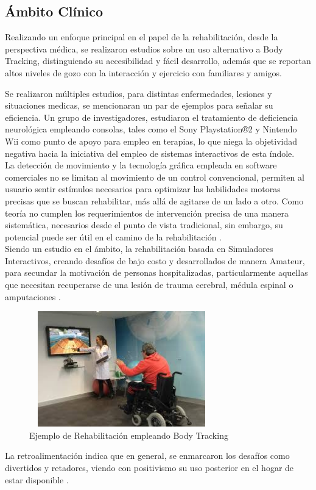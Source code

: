 \subsection{Ámbito Clínico}
Realizando un enfoque principal en el papel de la rehabilitación, desde la perspectiva médica, se realizaron estudios sobre un uso alternativo a Body Tracking, distinguiendo su accesibilidad y fácil desarrollo, además que se reportan altos niveles de gozo con la interacción y ejercicio con familiares y amigos. 

Se realizaron múltiples estudios, para distintas enfermedades, lesiones y situaciones medicas, se mencionaran un par de ejemplos para señalar su eficiencia. Un grupo de investigadores, estudiaron el tratamiento de deficiencia neurológica empleando consolas, tales como el Sony Playstation®2 \cite{rand2008sony} y Nintendo Wii \cite{herz2013nintendo} como punto de apoyo para empleo en terapias, lo que niega la objetividad negativa hacia la iniciativa del empleo de sistemas interactivos de esta índole.\\

La detección de movimiento y la tecnología gráfica empleada en software comerciales no se limitan al movimiento de un control convencional, permiten al usuario sentir estímulos necesarios para optimizar las habilidades motoras precisas que se buscan rehabilitar, más allá de agitarse de un lado a otro. Como teoría no cumplen los requerimientos de intervención precisa de una manera sistemática, necesarios desde el punto de vista tradicional, sin embargo, su potencial puede ser útil en el camino de la rehabilitación \cite{lange2011markerless}. \\

Siendo un estudio en el ámbito, la rehabilitación basada en Simuladores Interactivos, creando desafíos de bajo costo y desarrollados de manera Amateur,  para secundar la motivación de personas hospitalizadas, particularmente aquellas que necesitan recuperarse de una lesión de trauma cerebral, médula espinal o amputaciones \cite{lange2011markerless}. 
\begin{figure}[t!]
	\centering
	\includegraphics[width=8cm,height=5cm,]{./Images/rehabilitacionexample.jpg}
	\caption{Ejemplo de Rehabilitación empleando Body Tracking}
	\label{rehabexample}
\end{figure}
La retroalimentación indica que en general, se enmarcaron los desafíos como divertidos y retadores, viendo con positivismo su uso posterior en el hogar de estar disponible \cite{lange2011leveraging}.\\

